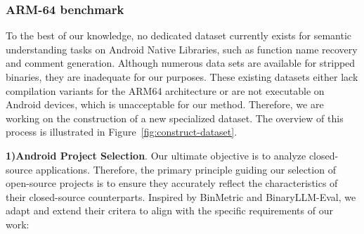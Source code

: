 \documentclass[acmsmall,screen,review,anonymous]{acmart} %
\begin{document}
\subsubsection{ARM-64 benchmark}
To the best of our knowledge, no dedicated dataset currently exists for semantic understanding tasks on Android Native Libraries, such as function name recovery and comment generation. Although numerous data sets are available for stripped binaries, they are inadequate for our purposes. These existing datasets either lack compilation variants for the ARM64 architecture or are not executable on Android devices, which is unacceptable for our method. Therefore, we are working on the construction of a new specialized dataset. The overview of this process is illustrated in Figure~\ref{fig:construct-dataset}.

\textbf{1)Android Project Selection}. Our ultimate objective is to analyze closed-source applications. Therefore, the primary principle guiding our selection of open-source projects is to ensure they accurately reflect the characteristics of their closed-source counterparts. Inspired by BinMetric\cite{BinMetric} and BinaryLLM-Eval\cite{BinaryLLM-Eval}, we adapt and extend their critera to align with the specific requirements of our work:
\end{document}
